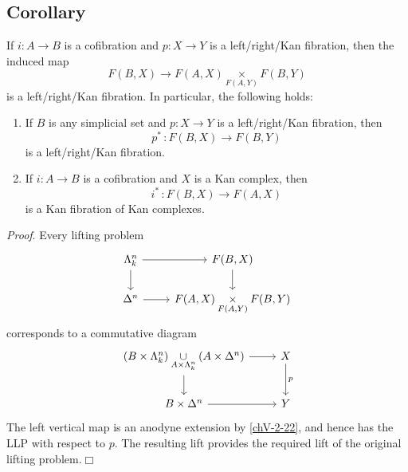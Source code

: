     \subsection{Corollary}\label{chV-2-23}
        If $i \colon A \to B$ is a cofibration and $p \colon X \to Y$ is a left/right/Kan fibration, then the induced map
        \begin{equation*}
            F(B, X) \to F(A, X) \underset{F(A, Y)}{\times} F(B, Y)
        \end{equation*}
        is a left/right/Kan fibration. In particular, the following holds:
        \begin{enumerate}[label=\roman*)]
            \item 
                If $B$ is any simplicial set and $p \colon X \to Y$ is a left/right/Kan fibration, then
                \begin{equation*}
                    p^{*} \,\colon F(B, X) \to F(B, Y)
                \end{equation*}
                is a left/right/Kan fibration.\label{chV-2-23-i}
            \item 
                If $i \colon A \to B$ is a cofibration and $X$ is a Kan complex, then
                \begin{equation*}
                    i^{*} \,\colon F(B, X) \to F(A, X)
                \end{equation*}
                is a Kan fibration of Kan complexes.
        \end{enumerate}

        \emph{Proof}. Every lifting problem
        \begin{equation*}
            \begin{tikzcd}
                \horn{n}{k} \arrow[r] \arrow[d] & F(B, X) \arrow[d] \\
                \Delta^n \arrow[r] & F(A, X) \underset{F(A, Y)}{\times} F(B, Y)
            \end{tikzcd}
        \end{equation*}
        corresponds to a commutative diagram
        \begin{equation*}
            \begin{tikzcd}
                (B \times \horn{n}{k}) \underset{A \times \horn{n}{k}}{\cup} (A \times \Delta^n) \arrow[r] \arrow[d] & X \arrow[d, "p"] \\
                B \times \Delta^n \arrow[r] & Y
            \end{tikzcd}
        \end{equation*}
        The left vertical map is an anodyne extension by \ref{chV-2-22}, and hence has the LLP with respect to $p$. The resulting lift provides the required lift of the original lifting problem.\hfill$\Box$


